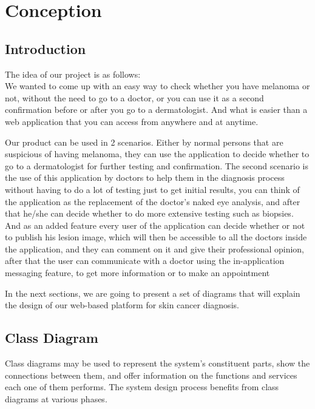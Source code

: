 \section{Conception}

\subsection{Introduction}
The idea of our project is as follows: \\ 
We wanted to come up with an easy way to check whether you have melanoma or not, without the need to go to a doctor, or you can use it as a second confirmation before or after you go to a dermatologist. And what is easier than a web application that you can access from anywhere and at anytime.

Our product can be used in 2 scenarios. Either by normal persons that are suspicious of having melanoma, they can use the application to decide whether to go to a dermatologist for further testing and confirmation. The second scenario is the use of this application by doctors to help them in the diagnosis process without having to do a lot of testing just to get initial results, you can think of the application as the replacement of the doctor's naked eye analysis, and after that he/she can decide whether to do more extensive testing such as biopsies. And as an added feature every user of the application can decide whether or not to publish his lesion image, which will then be accessible to all the doctors inside the application, and they can comment on it and give their professional opinion, after that the user can communicate with a doctor using the in-application messaging feature, to get more information or to make an appointment

In the next sections, we are going to present a set of diagrams that will explain the design of our web-based platform for skin cancer diagnosis.

\subsection{Class Diagram}
Class diagrams may be used to represent the system's constituent parts, show the connections between them, and offer information on the functions and services each one of them performs. The system design process benefits from class diagrams at various phases.

